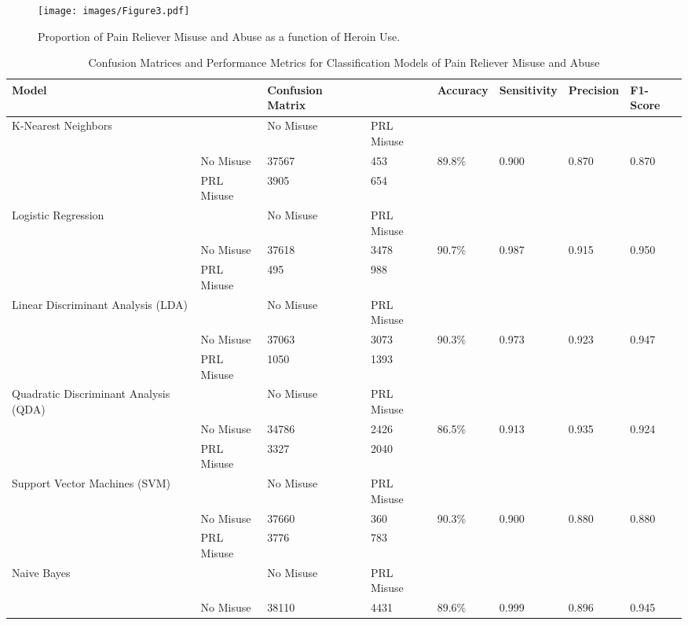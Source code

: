 \documentclass[sigconf]{acmart}
\begin{document}
\begin{figure}[!ht]
  \centering\texttt{[image: images/Figure3.pdf]}
  \caption{Proportion of Pain Reliever Misuse and Abuse
  as a function of Heroin Use.}
  \label{f:Figure3}
\end{figure}

 
\begin{table*}[ht]
  \caption{Confusion Matrices and Performance Metrics for Classification 
  Models of Pain Reliever Misuse and Abuse}
  \label{tab:freq}
  \begin{tabular}{llllllll}
    \toprule
    Model& & Confusion Matrix & & Accuracy & Sensitivity & Precision & F1-Score \\
    \midrule
    K-Nearest Neighbors & & No Misuse & PRL Misuse &  &  &  & \\
     & No Misuse & 37567 & 453 & 89.8\% & 0.900 & 0.870 & 0.870 \\
     & PRL Misuse & 3905 & 654 &  &  &  & \\
    \midrule
    Logistic Regression & & No Misuse & PRL Misuse &  &  &  & \\
     & No Misuse & 37618 & 3478 & 90.7\% & 0.987 & 0.915 & 0.950 \\
     & PRL Misuse &  495 &  988 &  &  &  & \\
    \midrule
    Linear Discriminant Analysis (LDA) & & No Misuse & PRL Misuse &  &  &  & \\
     & No Misuse & 37063 & 3073 & 90.3\% & 0.973 & 0.923 & 0.947 \\
     & PRL Misuse & 1050 & 1393 &  &  &  & \\
    \midrule
    Quadratic Discriminant Analysis (QDA) & & No Misuse & PRL Misuse &  &  &  & \\
     & No Misuse & 34786 & 2426 & 86.5\% & 0.913 & 0.935 & 0.924 \\
     & PRL Misuse & 3327 & 2040 &  &  &  & \\
    \midrule
    Support Vector Machines (SVM) & & No Misuse & PRL Misuse &  &  &  & \\
     & No Misuse & 37660 & 360 & 90.3\% & 0.900 & 0.880 & 0.880 \\
     & PRL Misuse & 3776 & 783 &  &  &  & \\
    \midrule
    Naive Bayes & & No Misuse & PRL Misuse &  &  &  & \\
     & No Misuse & 38110 & 4431 & 89.6\% & 0.999 & 0.896 & 0.945 \\

\end{tabular}
\end{table*}
\end{document}
